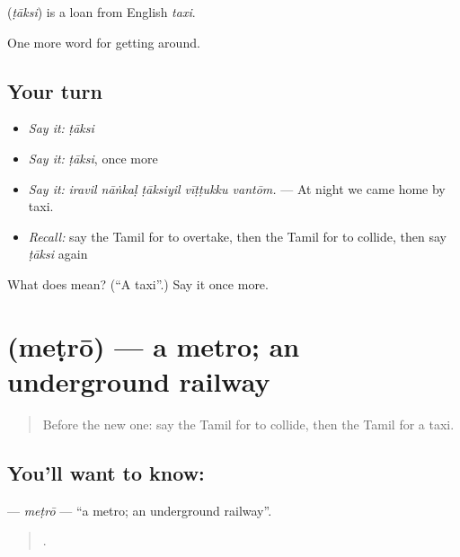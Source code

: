 \begin{cousinweb}
\textbf{} (\emph{ṭāksi}) is a loan from English \emph{taxi}.
\end{cousinweb}

\begin{grammarlens}[title={What you've built}]
One more word for getting around.
\end{grammarlens}

\subsection*{Your turn}
\begin{itemize}
\raggedright
  \item \emph{Say it:} \emph{ṭāksi}
  \item \emph{Say it:} \emph{ṭāksi}, once more
  \item \emph{Say it:} \emph{iravil nāṅkaḷ ṭāksiyil vīṭṭukku vantōm.} — At night we came home by taxi.
  \item \emph{Recall:} say the Tamil for to overtake, then the Tamil for to collide, then say \emph{ṭāksi} again
\end{itemize}

\begin{tcolorbox}[breakable,colback=teal!4,colframe=teal!35!black,title={Before you move on}]
What does  mean? (\textquotedblleft{}A taxi\textquotedblright{}.) Say it once more.
\end{tcolorbox}
\section[\texorpdfstring{\ta{மெட்ரோ} (meṭrō)}{மெட்ரோ (meṭrō)}]{ (meṭrō) — a metro; an underground railway}

\label{lesson:TA-C405-metro}



\begin{quote}
Before the new one: say the Tamil for to collide, then the Tamil for a taxi.
\end{quote}

\subsection*{You'll want to know: }
\textbf{} — \emph{meṭrō} — \textquotedblleft{}a metro; an underground railway\textquotedblright{}.

\begin{quote}
    .
\end{quote}

